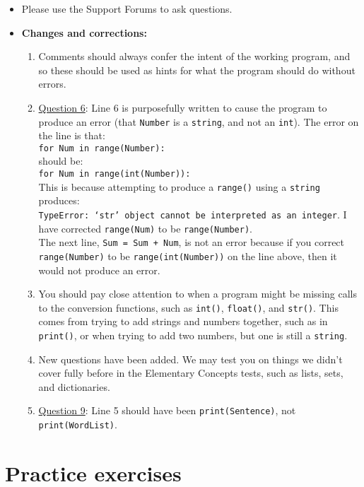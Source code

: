 \documentclass[11pt]{report}
\begin{document}
\begin{itemize}
    \item Please use the Support Forums to ask questions.\\
    \item \textbf{Changes and corrections:}
    \begin{enumerate}
        \item Comments should always confer the intent of the working program, and so these should be used as hints for what the program should do without errors.
        \item \underline{Question 6}: Line 6 is purposefully written to cause the program to produce an error (that {\tt Number} is a {\tt string}, and not an {\tt int}). The error on the line is that:\\
        {\tt for Num in range(Number):}\\
        should be:\\
        {\tt for Num in range(int(Number)):}\\
        This is because attempting to produce a {\tt range()} using a {\tt string} produces:\\
        {\tt TypeError: `str' object cannot be interpreted as an integer}. I have corrected {\tt range(Num)} to be {\tt range(Number)}.\\
        The next line, {\tt Sum = Sum + Num}, is not an error because if you correct {\tt range(Number)} to be {\tt range(int(Number))} on the line above, then it would not produce an error.
        \item You should pay close attention to when a program might be missing calls to the conversion functions, such as {\tt int()}, {\tt float()}, and {\tt str()}. This comes from trying to add strings and numbers together, such as in {\tt print()}, or when trying to add two numbers, but one is still a {\tt string}.
        \item New questions have been added. We may test you on things we didn't cover fully before in the Elementary Concepts tests, such as lists, sets, and dictionaries.
        \item \underline{Question 9}: Line 5 should have been {\tt print(Sentence)}, not {\tt print(WordList)}.
    \end{enumerate}
\end{itemize}

\section*{Practice exercises}
\end{document}
